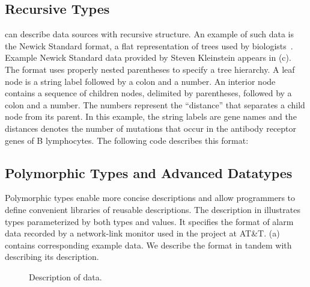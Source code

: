 \subsection{Recursive Types}

\padsml{} can describe data sources with recursive structure.  An
example of such data is the Newick Standard format, a flat representation
of trees used by biologists~\cite{newick}.
Example Newick Standard data provided by Steven Kleinstein appears in
(c). 
The format uses properly nested
parentheses to specify a tree hierarchy.  A leaf node is a string
label followed by a colon and a number.  An interior node contains a
sequence of children nodes, delimited by parentheses, followed by a
colon and a number.  The numbers represent the ``distance'' that
separates a child node from its parent. 
In this example,  the string labels are gene names and the distances denotes the number of mutations that occur in the antibody receptor genes of B lymphocytes. 
The following \padsml{} code 
describes this format:

 

\subsection{Polymorphic Types and Advanced Datatypes}

Polymorphic types enable more concise descriptions and allow
programmers to define convenient libraries of reusable descriptions. The
description in  illustrates types
parameterized by both types and values.  It specifies
the format of alarm data recorded by a network-link monitor used in
the \darkstar{} project at AT\&T.  (a) contains corresponding example data. We describe the format in tandem with describing its \padsml{} description.
\begin{figure}
  \centering
  
  \caption{Description of \darkstar{} data.}
  \label{fig:darkstar-ml}
\end{figure}

